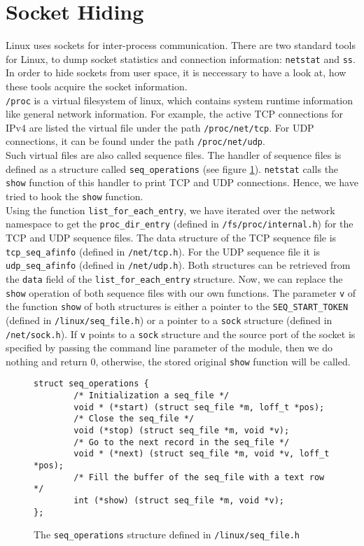\section{Socket Hiding}
Linux uses sockets for inter-process communication. There are two standard tools for Linux, to dump socket statistics and connection information: \texttt{netstat} and \texttt{ss}. In order to hide sockets from user space, it is neccessary to have a look at, how these tools acquire the socket information. \\
\verb+/proc+ is a virtual filesystem of linux, which contains system runtime information like general network information. For example, the active TCP connections for IPv4 are listed the virtual file under the path \verb+/proc/net/tcp+. For UDP connections, it can be found under the path \verb+/proc/net/udp+.\\
Such virtual files are also called sequence files. The handler of sequence files 
is defined as a structure called \verb+seq_operations+ (see figure 
\ref{ls:op}). \verb+netstat+ calls the \verb+show+ function of this handler to print TCP and UDP 
connections. Hence, we have tried to hook the \verb+show+ function.\\
Using the function \verb+list_for_each_entry+, we have iterated over the network 
namespace to get the \verb+proc_dir_entry+ (defined in 
\verb+/fs/proc/internal.h+) for the TCP and UDP sequence files. The data 
structure of the TCP sequence file is \verb+tcp_seq_afinfo+ (defined in 
\verb+/net/tcp.h+). For the UDP sequence file it is \verb+udp_seq_afinfo+ 
(defined in \verb+/net/udp.h+). Both structures can be retrieved from the 
\verb+data+ field of the \verb+list_for_each_entry+ structure. Now, we can 
replace the \verb+show+ operation of both sequence files with our own 
functions. The parameter \verb+v+ of the function \verb+show+ of both 
structures is either a pointer to the \verb+SEQ_START_TOKEN+ (defined in 
\verb+/linux/seq_file.h+) or a pointer to a \verb+sock+ structure (defined in 
\verb+/net/sock.h+). If \verb+v+ points to a \verb+sock+ structure and the 
source port of the socket is specified by passing the command line parameter of 
the module, then we do nothing and return 0, otherwise, the stored original 
\verb+show+ function will be called.
\begin{center}
\begin{figure}
\lstset{escapechar=,style=customc}
\begin{lstlisting}
struct seq_operations {
		/* Initialization a seq_file */		
		void * (*start) (struct seq_file *m, loff_t *pos);
		/* Close the seq_file */
		void (*stop) (struct seq_file *m, void *v);
		/* Go to the next record in the seq_file */
		void * (*next) (struct seq_file *m, void *v, loff_t *pos);
		/* Fill the buffer of the seq_file with a text row */
		int (*show) (struct seq_file *m, void *v);
};
\end{lstlisting}
\caption{The \texttt{seq\_operations} structure defined in 
\texttt{/linux/seq\_file.h}}
\label{ls:op}
\end{figure}
\end{center}
